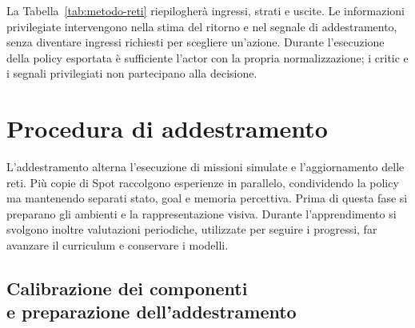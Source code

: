 La Tabella~\ref{tab:metodo-reti} riepilogherà ingressi, strati e uscite. Le informazioni privilegiate intervengono nella stima del ritorno e nel segnale di addestramento, senza diventare ingressi richiesti per scegliere un'azione. Durante l'esecuzione della policy esportata è sufficiente l'actor con la propria normalizzazione; i critic e i segnali privilegiati non partecipano alla decisione.

\begin{table}[tbp]
    \centering
    \caption[Dimensioni delle reti di navigazione]{Riepilogo delle architetture dell'actor e dei critic per scenario. Le dimensioni si riferiscono alle reti di navigazione, distinte dal controllore locomotorio congelato.}
    \label{tab:metodo-reti}
\end{table}

\section{Procedura di addestramento}
\label{sec:metodo-addestramento}

L'addestramento alterna l'esecuzione di missioni simulate e l'aggiornamento delle reti. Più copie di Spot raccolgono esperienze in parallelo, condividendo la policy ma mantenendo separati stato, goal e memoria percettiva. Prima di questa fase si preparano gli ambienti e la rappresentazione visiva. Durante l'apprendimento si svolgono inoltre valutazioni periodiche, utilizzate per seguire i progressi, far avanzare il curriculum e conservare i modelli.

\subsection[Calibrazione dei componenti e preparazione dell'addestramento]{Calibrazione dei componenti\\e preparazione dell'addestramento}

